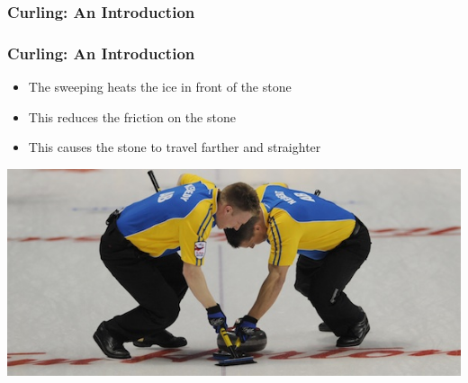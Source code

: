 \documentclass{beamer}
\begin{document}
\begin{frame}\frametitle{Curling: An Introduction}
\end{frame}

\begin{frame}\frametitle{Curling: An Introduction}
    \begin{itemize}
        \item The sweeping heats the ice in front of the stone
        \item This reduces the friction on the stone
        \item This causes the stone to travel farther and straighter
    \end{itemize}
    \centering
    \includegraphics[width=1.0\textwidth]{Images/Sweeping.jpg}
\end{frame}
\end{document}
